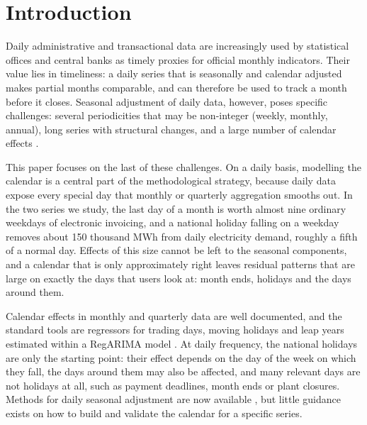 \documentclass[Afour, times]{sagej}
\begin{document}
\section{Introduction}
\label{sec:intro}

Daily administrative and transactional data are increasingly used by statistical offices and central banks as timely proxies for official monthly indicators. Their value lies in timeliness: a daily series that is seasonally and calendar adjusted makes partial months comparable, and can therefore be used to track a month before it closes. Seasonal adjustment of daily data, however, poses specific challenges: several periodicities that may be non-integer (weekly, monthly, annual), long series with structural changes, and a large number of calendar effects \cite{ollech2021,webel2022,webelsmyk2023,ollech2023}.

This paper focuses on the last of these challenges. On a daily basis, modelling the calendar is a central part of the methodological strategy, because daily data expose every special day that monthly or quarterly aggregation smooths out. In the two series we study, the last day of a month is worth almost nine ordinary weekdays of electronic invoicing, and a national holiday falling on a weekday removes about 150 thousand MWh from daily electricity demand, roughly a fifth of a normal day. Effects of this size cannot be left to the seasonal components, and a calendar that is only approximately right leaves residual patterns that are large on exactly the days that users look at: month ends, holidays and the days around them.

Calendar effects in monthly and quarterly data are well documented, and the standard tools are regressors for trading days, moving holidays and leap years estimated within a RegARIMA model \cite{bellhillmer1983,findley1998,essguidelines2015}. At daily frequency, the national holidays are only the starting point: their effect depends on the day of the week on which they fall, the days around them may also be affected, and many relevant days are not holidays at all, such as payment deadlines, month ends or plant closures. Methods for daily seasonal adjustment are now available \cite{ollech2021,proietti2023,webelsmyk2023}, but little guidance exists on how to build and validate the calendar for a specific series.
\end{document}

